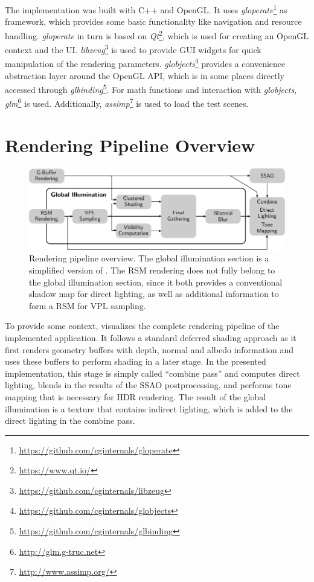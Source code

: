 The implementation was built with C++ and OpenGL. It uses \textit{gloperate}\footnote{\url{https://github.com/cginternals/gloperate}} as framework, which provides some basic functionality like navigation and resource handling. \textit{gloperate} in turn is based on \textit{Qt}\footnote{\url{https://www.qt.io/}}, which is used for creating an OpenGL context and the UI. \textit{libzeug}\footnote{\url{https://github.com/cginternals/libzeug}} is used to provide GUI widgets for quick manipulation of the rendering parameters. \textit{globjects}\footnote{\url{https://github.com/cginternals/globjects}} provides a convenience abstraction layer around the OpenGL API, which is in some places directly accessed through \textit{glbinding}\footnote{\url{https://github.com/cginternals/glbinding}}. For math functions and interaction with \textit{globjects}, \textit{glm}\footnote{\url{http://glm.g-truc.net}} is used. Additionally, \textit{assimp}\footnote{\url{http://www.assimp.org/}} is used to load the test scenes.


\section{Rendering Pipeline Overview}

\begin{figure}[h]
    \includegraphics[width=\textwidth]{graphics/rendering_pipeline_overview}
    \caption{Rendering pipeline overview. The global illumination section is a simplified version of . The RSM rendering does not fully belong to the global illumination section, since it both provides a conventional shadow map for direct lighting, as well as additional information to form a RSM for VPL sampling.}
    \label{fig:RenderingPipelineOverview}
\end{figure}

To provide some context,  visualizes the complete rendering pipeline of the implemented application. It follows a standard deferred shading approach as it first renders geometry buffers with depth, normal and albedo information and uses these buffers to perform shading in a later stage. In the presented implementation, this stage is simply called ``combine pass'' and computes direct lighting, blends in the results of the SSAO postprocessing, and performs tone mapping that is necessary for HDR rendering. The result of the global illumination is a texture that contains indirect lighting, which is added to the direct lighting in the combine pass.

